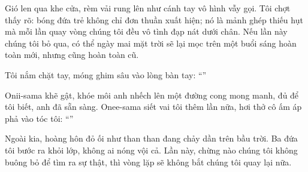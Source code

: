 \documentclass[../main.tex]{subfiles}
\begin{document}
Gió len qua khe cửa, rèm vải rung lên như cánh tay vô hình vẫy gọi. Tôi chợt thấy rõ: bóng đứa trẻ không chỉ đơn thuần xuất hiện; nó là mảnh ghép thiếu hụt mà mỗi lần quay vòng chúng tôi đều vô tình đạp nát dưới chân. Nếu lần này chúng tôi bỏ qua, có thể ngày mai mặt trời sẽ lại mọc trên một buổi sáng hoàn toàn mới, nhưng cũng hoàn toàn cũ.

Tôi nắm chặt tay, móng ghim sâu vào lòng bàn tay: ``''

Onii-sama khẽ gật, khóe môi anh nhếch lên một đường cong mong manh, đủ để tôi biết, anh đã sẵn sàng. Onee-sama siết vai tôi thêm lần nữa, hơi thở cô ấm áp phả vào tóc tôi: ``''

Ngoài kia, hoàng hôn đỏ ối như than than đang chảy dần trên bầu trời. Ba đứa tôi bước ra khỏi lớp, không ai nóng vội cả. Lần này, chừng nào chúng tôi không buông bỏ để tìm ra sự thật, thì vòng lặp sẽ không bắt chúng tôi quay lại nữa.
\end{document}
